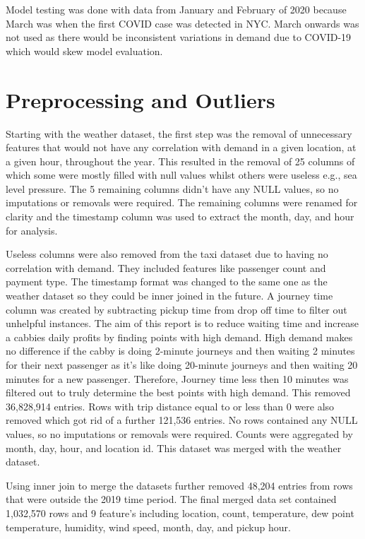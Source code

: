 \documentclass[11pt]{article}
\begin{document}
Model testing was done with data from January and February of 2020 because March was when the first COVID case was detected in NYC. March onwards was not used as there would be inconsistent variations in demand due to COVID-19 which would skew model evaluation.

\section{Preprocessing and Outliers}
 Starting with the weather dataset, the first step was the removal of unnecessary features that would not have any correlation with demand in a given location, at a given hour, throughout the year. This resulted in the removal of 25 columns of which some were mostly filled with null values whilst others were useless e.g., sea level pressure. The 5 remaining columns didn't have any NULL values, so no imputations or removals were required. The remaining columns were renamed for clarity and the timestamp column was used to extract the month, day, and hour for analysis.
 
Useless columns were also removed from the taxi dataset due to having no correlation with demand. They included features like passenger count and payment type. The timestamp format was changed to the same one as the weather dataset so they could be inner joined in the future. A journey time column was created by subtracting pickup time from drop off time to filter out unhelpful instances. The aim of this report is to reduce waiting time and increase a cabbies daily profits by finding points with high demand. High demand makes no difference if the cabby is doing 2-minute journeys and then waiting 2 minutes for their next passenger as it’s like doing 20-minute journeys and then waiting 20 minutes for a new passenger. Therefore, Journey time less then 10 minutes was filtered out to truly determine the best points with high demand. This removed 36,828,914 entries. Rows with trip distance equal to or less than 0 were also removed which got rid of a further 121,536 entries. No rows contained any NULL values, so no imputations or removals were required. Counts were aggregated by month, day, hour, and location id. This dataset was merged with the weather dataset.

Using inner join to merge the datasets further removed 48,204 entries from rows that were outside the 2019 time period. The final merged data set contained 1,032,570 rows and 9 feature’s including location, count, temperature, dew point temperature, humidity, wind speed, month, day, and pickup hour.
\end{document}
